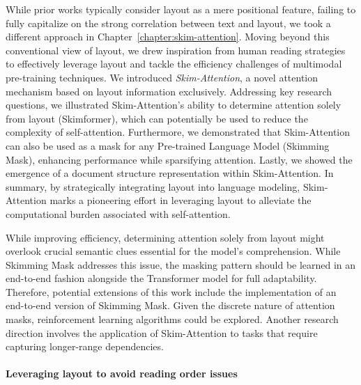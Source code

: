 While prior works typically consider layout as a mere positional feature, failing to fully capitalize on the strong correlation between text and layout, we took a different approach in Chapter~\ref{chapter:skim-attention}. Moving beyond this conventional view of layout, we drew inspiration from human reading strategies to effectively leverage layout and tackle the efficiency challenges of multimodal pre-training techniques. We introduced \textit{Skim-Attention}, a novel attention mechanism based on layout information exclusively. Addressing key research questions, we illustrated Skim-Attention's ability to determine attention solely from layout (Skimformer), which can potentially be used to reduce the complexity of self-attention. Furthermore, we demonstrated that Skim-Attention can also be used as a mask for any Pre-trained Language Model (Skimming Mask), enhancing performance while sparsifying attention. Lastly, we showed the emergence of a document structure representation within Skim-Attention. In summary, by strategically integrating layout into language modeling, Skim-Attention marks a pioneering effort in leveraging layout to alleviate the computational burden associated with self-attention.

While improving efficiency, determining attention solely from layout might overlook crucial semantic clues essential for the model's comprehension. While Skimming Mask addresses this issue, the masking pattern should be learned in an end-to-end fashion alongside the Transformer model for full adaptability. Therefore, potential extensions of this work include the implementation of an end-to-end version of Skimming Mask. Given the discrete nature of attention masks, reinforcement learning algorithms could be explored. Another research direction involves the application of Skim-Attention to tasks that require capturing longer-range dependencies. 

\paragraph{Leveraging layout to avoid reading order issues}

